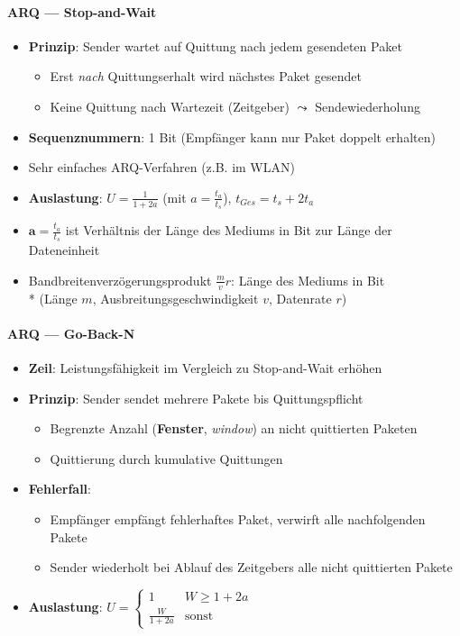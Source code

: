 \paragraph{ARQ --- Stop-and-Wait}
\begin{itemize}
  \item \textbf{Prinzip}: Sender wartet auf Quittung nach jedem gesendeten Paket
  \begin{itemize}
    \item Erst \emph{nach} Quittungserhalt wird nächstes Paket gesendet
    \item Keine Quittung nach Wartezeit (Zeitgeber) \( \leadsto \) Sendewiederholung
  \end{itemize}
  \item \textbf{Sequenznummern}: 1 Bit (Empfänger kann nur Paket doppelt erhalten)
  \item Sehr einfaches ARQ-Verfahren (z.B. im WLAN)
  \item \textbf{Auslastung}: \( U = \tfrac{1}{1+2a} \) (mit \( a = \tfrac{t_a}{t_s} \)), \( t_{Ges} = t_s + 2t_a \)
  \item $\textbf{a} = \tfrac{t_a}{t_s}$ ist Verhältnis der Länge des Mediums in Bit zur Länge der Dateneinheit
  \item Bandbreitenverzögerungsprodukt \( \tfrac{m}{v}r \): Länge des Mediums in Bit \\*
  (Länge \( m \), Ausbreitungsgeschwindigkeit \( v \), Datenrate \( r \))
\end{itemize}

\paragraph{ARQ --- Go-Back-N}
\begin{itemize}
  \item \textbf{Zeil}: Leistungsfähigkeit im Vergleich zu Stop-and-Wait erhöhen
  \item \textbf{Prinzip}: Sender sendet mehrere Pakete bis Quittungspflicht
  \begin{itemize}
    \item Begrenzte Anzahl (\textbf{Fenster}, \emph{window}) an nicht quittierten Paketen
    \item Quittierung durch kumulative Quittungen
  \end{itemize}
  \item \textbf{Fehlerfall}:
  \begin{itemize}
    \item Empfänger empfängt fehlerhaftes Paket, verwirft alle nachfolgenden Pakete
    \item Sender wiederholt bei Ablauf des Zeitgebers alle nicht quittierten Pakete
  \end{itemize}
  \item \textbf{Auslastung}: \( U = \begin{cases}
    1 & W \geq 1+2a \\
    \tfrac{W}{1+2a} & \text{sonst}
  \end{cases} \)
\end{itemize}

